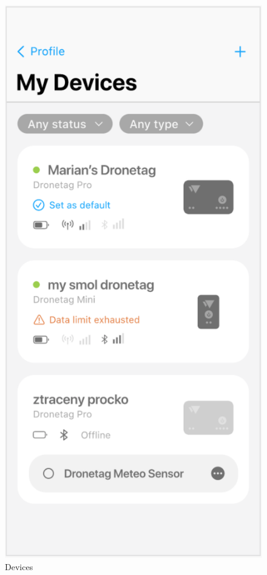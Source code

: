 \begin{figure}
    \centering
    \begin{minipage}{.4\textwidth}
        \centering
        \includegraphics[width=.7\linewidth]{assets/user_interface_design/device/devices.png}
        \caption{Devices}
        \label{fig:devices}
    \end{minipage}%
    \hspace{.05\linewidth}
    \begin{minipage}{.4\textwidth}
        \centering

\end{minipage}
\end{figure}

